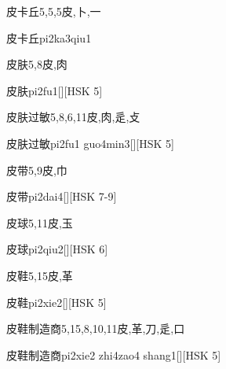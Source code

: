 \begin{Entry}{皮卡丘}{5,5,5}{⽪,⼘,⼀}
  \begin{Phonetics}{皮卡丘}{pi2ka3qiu1}
  \end{Phonetics}
\end{Entry}

\begin{Entry}{皮肤}{5,8}{⽪,⾁}
  \begin{Phonetics}{皮肤}{pi2fu1}[][HSK 5]
  \end{Phonetics}
\end{Entry}

\begin{Entry}{皮肤过敏}{5,8,6,11}{⽪,⾁,⾡,⽁}
  \begin{Phonetics}{皮肤过敏}{pi2fu1 guo4min3}[][HSK 5]
  \end{Phonetics}
\end{Entry}

\begin{Entry}{皮带}{5,9}{⽪,⼱}
  \begin{Phonetics}{皮带}{pi2dai4}[][HSK 7-9]
  \end{Phonetics}
\end{Entry}

\begin{Entry}{皮球}{5,11}{⽪,⽟}
  \begin{Phonetics}{皮球}{pi2qiu2}[][HSK 6]
  \end{Phonetics}
\end{Entry}

\begin{Entry}{皮鞋}{5,15}{⽪,⾰}
  \begin{Phonetics}{皮鞋}{pi2xie2}[][HSK 5]
  \end{Phonetics}
\end{Entry}

\begin{Entry}{皮鞋制造商}{5,15,8,10,11}{⽪,⾰,⼑,⾡,⼝}
  \begin{Phonetics}{皮鞋制造商}{pi2xie2 zhi4zao4 shang1}[][HSK 5]
  \end{Phonetics}
\end{Entry}

